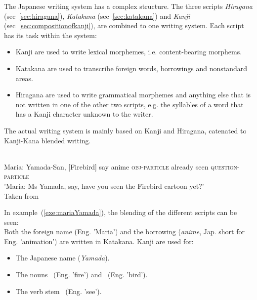 The Japanese writing system has a complex structure. The three scripts 
\emph{Hiragana} (sec~\ref{sec:hiragana}),
\emph{Katakana} (sec~\ref{sec:katakana}) and
\emph{Kanji} (sec~\ref{sec:compositionofkanji}),
are combined to one writing system. Each script has its task within the system:
\begin{itemize}

  \item Kanji are used to write lexical morphemes, i.e. content-bearing morphems.

  \item Katakana are used to transcribe foreign words, borrowings and 
        nonstandard areas.

  \item Hiragana are used to write grammatical morphemes and anything else that
        is not written in one of the other two scripts, e.g. the syllables
        of a word that has a Kanji character unknown to the writer.

\end{itemize}
The actual writing system is mainly based on Kanji and Hiragana, catenated to
Kanji-Kana blended writing.
\begin{exe}
\ex\label{exe:mariaYamada}
\gll 
  \\
 Maria: Yamada-San, [Firebird] say anime \textsc{obj-particle} already seen \textsc{question-particle} \\
\trans 'Maria: Ms Yamada, say, have you seen the Firebird cartoon yet?' \\
Taken from~
\end{exe}
In example~(\ref{exe:mariaYamada}), the blending of the different scripts 
can be seen:\\
Both the foreign name   (Eng. 'Maria') and the borrowing 
 (\emph{anime}, Jap. short for Eng. 'animation') are written in 
Katakana. Kanji are used for:
\begin{itemize}
\item The Japanese name  (\emph{Yamada}).
\item The nouns ~(Eng. 'fire') and 
      ~(Eng. 'bird').
\item The verb stem ~(Eng. 'see').
\end{itemize}
